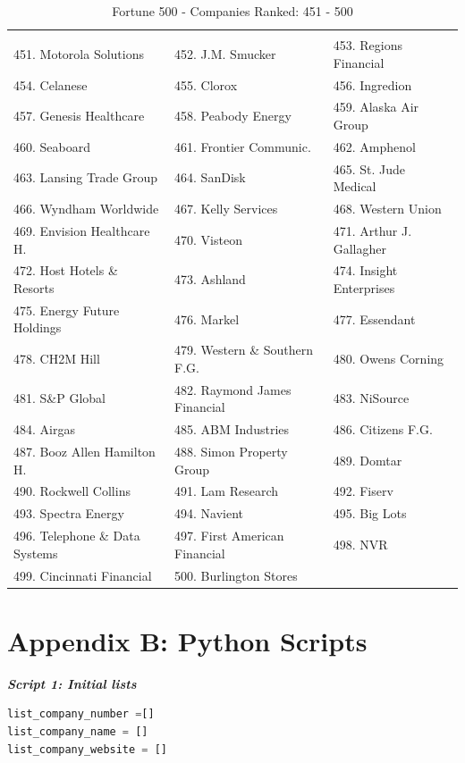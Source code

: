 \documentclass{book}
\begin{document}
\begin{table}[H]
\centering
\caption{Fortune 500 - Companies Ranked: 451 - 500}
\begin{tabular}{lll}
\hline
 \\ 451. Motorola Solutions 
&  452. J.M. Smucker 
&  453. Regions Financial 
\\ 454. Celanese 
&  455. Clorox 
&  456. Ingredion 
\\ 457. Genesis Healthcare 
&  458. Peabody Energy 
&  459. Alaska Air Group 
\\ 460. Seaboard 
&  461. Frontier Communic. 
&  462. Amphenol 
\\ 463. Lansing Trade Group 
&  464. SanDisk 
&  465. St. Jude Medical 
\\ 466. Wyndham Worldwide 
&  467. Kelly Services 
&  468. Western Union 
\\ 469. Envision Healthcare H. 
&  470. Visteon 
&  471. Arthur J. Gallagher 
\\ 472. Host Hotels \& Resorts 
&  473. Ashland 
&  474. Insight Enterprises 
\\ 475. Energy Future Holdings 
&  476. Markel 
&  477. Essendant 
\\ 478. CH2M Hill 
&  479. Western \& Southern F.G. 
&  480. Owens Corning 
\\ 481. S\&P Global 
&  482. Raymond James Financial 
&  483. NiSource 
\\ 484. Airgas 
&  485. ABM Industries 
&  486. Citizens F.G.
\\ 487. Booz Allen Hamilton H. 
&  488. Simon Property Group 
&  489. Domtar 
\\ 490. Rockwell Collins 
&  491. Lam Research 
&  492. Fiserv 
\\ 493. Spectra Energy 
&  494. Navient 
&  495. Big Lots 
\\ 496. Telephone \& Data Systems 
&  497. First American Financial 
&  498. NVR 
\\ 499. Cincinnati Financial 
&  500. Burlington Stores 
&
 \\ \hline

\end{tabular}
\end{table}
\newpage
\section{Appendix B: Python Scripts} \label{appP}

\begin{center}
\textit{\textbf{Script 1: Initial lists}}\label{p1}
\end{center}
\begin{lstlisting}[language=Python]
list_company_number =[]
list_company_name = []
list_company_website = []
\end{lstlisting}
\end{document}

